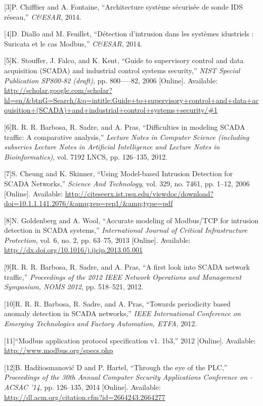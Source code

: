 \documentclass[11pt,a4paper]{article}
\begin{document}
{[}3{]}P. Chifflier and A. Fontaine, ``Architecture système sécurisée de
sonde IDS réseau,'' \emph{C\&ESAR}, 2014.

{[}4{]}D. Diallo and M. Feuillet, ``Détection d'intrusion dans les
systèmes idustriels : Suricata et le cas Modbus,'' \emph{C\&ESAR}, 2014.

{[}5{]}K. Stouffer, J. Falco, and K. Kent, ``Guide to supervisory
control and data acquisition (SCADA) and industrial control systems
security,'' \emph{NIST Special Publication SP800-82 (draft)}, pp.
800-----82, 2006 {[}Online{]}. Available:
\url{http://scholar.google.com/scholar?hl=en/\&btnG=Search/\&q=intitle:Guide+to+supervisory+control+and+data+acquisition+(SCADA)+and+industrial+control+systems+security/\#1}

{[}6{]}R. R. R. Barbosa, R. Sadre, and A. Pras, ``Difficulties in
modeling SCADA traffic: A comparative analysis,'' \emph{Lecture Notes in
Computer Science (including subseries Lecture Notes in Artificial
Intelligence and Lecture Notes in Bioinformatics)}, vol. 7192 LNCS, pp.
126--135, 2012.

{[}7{]}S. Cheung and K. Skinner, ``Using Model-based Intrusion Detection
for SCADA Networks,'' \emph{Science And Technology}, vol. 329, no. 7461,
pp. 1--12, 2006 {[}Online{]}. Available:
\url{http://citeseerx.ist.psu.edu/viewdoc/download?doi=10.1.1.141.2076/\&amp;rep=rep1/\&amp;type=pdf}

{[}8{]}N. Goldenberg and A. Wool, ``Accurate modeling of Modbus/TCP for
intrusion detection in SCADA systems,'' \emph{International Journal of
Critical Infrastructure Protection}, vol. 6, no. 2, pp. 63--75, 2013
{[}Online{]}. Available:
\url{http://dx.doi.org/10.1016/j.ijcip.2013.05.001}

{[}9{]}R. R. R. Barbosa, R. Sadre, and A. Pras, ``A first look into
SCADA network traffic,'' \emph{Proceedings of the 2012 IEEE Network
Operations and Management Symposium, NOMS 2012}, pp. 518--521, 2012.

{[}10{]}R. R. R. Barbosa, R. Sadre, and A. Pras, ``Towards periodicity
based anomaly detection in SCADA networks,'' \emph{IEEE International
Conference on Emerging Technologies and Factory Automation, ETFA}, 2012.

{[}11{]}``Modbus application protocol specification v1. 1b3,'' 2012
{[}Online{]}. Available: \url{http://www.modbus.org/specs.php}

{[}12{]}B. Hadžiosmanović D and P. Hartel, ``Through the eye of the
PLC,'' \emph{Proceedings of the 30th Annual Computer Security
Applications Conference on - ACSAC '14}, pp. 126--135, 2014
{[}Online{]}. Available:
\url{http://dl.acm.org/citation.cfm?id=2664243.2664277}
\end{document}
